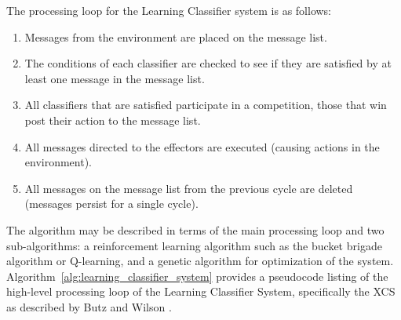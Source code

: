 The processing loop for the Learning Classifier system is as follows:

\begin{enumerate}
	\item Messages from the environment are placed on the message list.
	\item The conditions of each classifier are checked to see if they are satisfied by at least one message in the message list.
	\item All classifiers that are satisfied participate in a competition, those that win post their action to the message list.
	\item All messages directed to the effectors are executed (causing actions in the environment).
	\item  All messages on the message list from the previous cycle are deleted (messages persist for a single cycle).
\end{enumerate}

The algorithm may be described in terms of the main processing loop and two sub-algorithms: a reinforcement learning algorithm such as the bucket brigade algorithm or Q-learning, and a genetic algorithm for optimization of the system.
Algorithm~\ref{alg:learning_classifier_system} provides a pseudocode listing of the high-level processing loop of the Learning Classifier System, specifically the XCS as described by Butz and Wilson \cite{Butz2002a}. 

